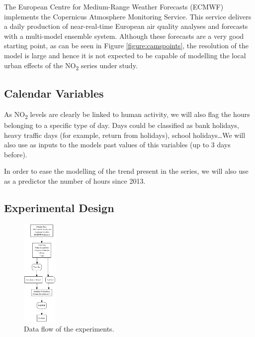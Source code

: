 \documentclass[a4paper,twocolumn,5p]{elsarticle}
\begin{document}
The European Centre for Medium-Range Weather Forecasts (ECMWF)
implements the Copernicus Atmosphere Monitoring Service.  This service
delivers a daily production of near-real-time European air quality
analyses and forecasts with a multi-model ensemble system. Although
these forecasts are a very good starting point, as can be seen in
Figure \ref{figure:camspoints}, the resolution of the model is large
and hence it is not expected to be capable of modelling the local
urban effects of the NO\textsubscript{2} series under study.

\subsection{Calendar Variables}
\label{sec:cal_data}

As NO\textsubscript{2} levels are clearly be linked to human activity,
we will also flag the hours belonging to a specific type of day. Days
could be classified as bank holidays, heavy traffic days (for example,
return from holidays), school holidays\ldots We will also use as
inputs to the models past values of this variables (up to 3 days
before).


In order to ease the modelling of the trend present in the series, we
will also use as a predictor the number of hours since
2013. 

\subsection{Experimental Design}
\label{sec:experimental-design}

\begin{figure}
  \centering
  \includegraphics[width=0.15\textwidth]{diagrams/flow}
  \caption{\label{figure:dataflow}Data flow of the
    experiments. }
\end{figure}
\end{document}
